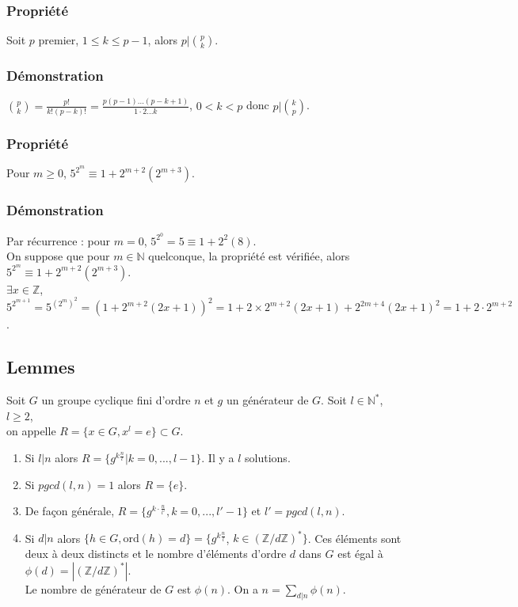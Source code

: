 \documentclass[a4paper,10pt]{book} %
\newcommand{\N}{\mathbb{N}}
\newcommand{\Z}{\mathbb{Z}}
\newcommand{\abs}[1]{\left|#1\right|}
\newcommand{\ord}{\mathrm{ord}}
\begin{document}
\subsubsection{Propriété}
Soit $p$ premier, $1\leq k\leq p-1$, alors $p|\binom{p}{k}$.

\subsubsection{Démonstration}
$\binom{p}{k} = \frac{p!}{k!(p-k)!} = \frac{p(p-1)...(p-k+1)}{1\cdot2...k}$, $0<k<p$ donc $p|\binom{k}{p}$.

\subsubsection{Propriété}
Pour $m\geq 0$, $5^{2^m}\equiv 1+2^{m+2}(2^{m+3})$.

\subsubsection{Démonstration}
Par récurrence : pour $m=0$, $5^{2^0}=5\equiv 1+2^2(8)$.\\
On suppose que pour $m\in \N$ quelconque, la propriété est vérifiée, alors $5^{2^m}\equiv 1+2^{m+2}(2^{m+3})$.\\
$\exists x\in \Z$, $5^{2^{m+1}}=5^{(2^m)^2}=(1+2^{m+2}(2x+1))^2=1+2\times 2^{m+2}(2x+1)+2^{2m+4}(2x+1)^2=1+2\cdot 2^{m+2}$.

\subsection{Lemmes}
Soit $G$ un groupe cyclique fini d'ordre $n$ et $g$ un générateur de $G$. Soit $l\in \N^*$, $l\geq 2$,\\on appelle $R=\{x\in G, x^l=e\}\subset G$.\\
\begin{enumerate}
\item Si $l|n$ alors $R=\{g^{k\frac{n}{l}}|k=0,...,l-1 \}$. Il y a $l$ solutions.\\
\item Si $pgcd(l,n)=1$ alors $R=\{e\}$.\\
\item De façon générale, $R = \{ g^{k\cdot \frac{n}{l'}}, k=0, ..., l'-1\}$
et $l'=pgcd(l,n)$.\\
\item Si $d|n$ alors $\{h\in G, \ord(h) = d\} = \{g^{k\frac{n}{l}}$, $k\in (\Z/d\Z)^*\}$. Ces éléments sont deux à deux distincts et le nombre d'éléments d'ordre $d$ dans $G$ est égal à $\phi(d)=\abs{(\Z/d\Z)^*}$.\\
Le nombre de générateur de $G$ est $\phi(n)$. On a $n=\sum_{d|n} \phi(n)$.
\end{enumerate}
\end{document}

